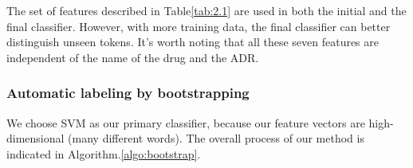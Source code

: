 The set of features described in Table\ref{tab:2.1} are used in both the initial and the final classifier. However, with more training data, the final classifier can better distinguish unseen tokens.
It’s worth noting that all these seven features are independent of the name of the drug 
and the ADR.

\subsubsection{Automatic labeling by bootstrapping}
\label{subsubsec:2.3.3}
We choose SVM as our primary classifier, because our feature vectors are high-dimensional (many different words). The overall process of our method is indicated in Algorithm.\ref{algo:bootstrap}.

